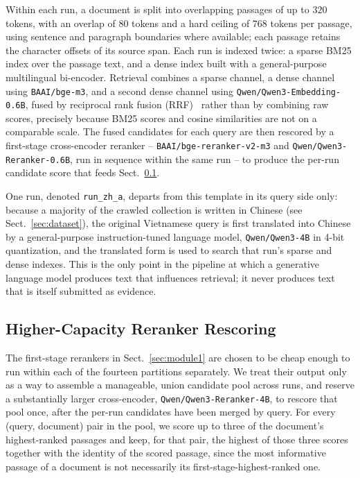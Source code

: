 \documentclass[runningheads]{llncs}
\begin{document}
Within each run, a document is split into overlapping passages of up to
$320$ tokens, with an overlap of $80$ tokens and a hard ceiling of $768$
tokens per passage, using sentence and paragraph boundaries where available;
each passage retains the character offsets of its source span. Each run is
indexed twice: a sparse BM25 index over the passage text, and a dense index
built with a general-purpose multilingual bi-encoder. Retrieval combines a
sparse channel, a dense channel using \texttt{BAAI/bge-m3}, and a second
dense channel using \texttt{Qwen/Qwen3-Embedding-0.6B}, fused by reciprocal
rank fusion (RRF)~\cite{cormack2009rrf} rather than by combining raw scores,
precisely because BM25 scores and cosine similarities are not on a comparable
scale. The fused candidates for each query are then rescored by a first-stage
cross-encoder reranker -- \texttt{BAAI/bge-reranker-v2-m3} and
\texttt{Qwen/Qwen3-Reranker-0.6B}, run in sequence within the same run -- to
produce the per-run candidate score that feeds Sect.~\ref{sec:module2}.

One run, denoted \texttt{run\_zh\_a}, departs from this template in its query
side only: because a majority of the crawled collection is written in
Chinese (see Sect.~\ref{sec:dataset}), the original Vietnamese query is first
translated into Chinese by a general-purpose instruction-tuned language model,
\texttt{Qwen/Qwen3-4B} in 4-bit quantization, and the translated form is used
to search that run's sparse and dense indexes. This is the only point in the
pipeline at which a generative language model produces text that influences
retrieval; it never produces text that is itself submitted as evidence.

\subsection{Higher-Capacity Reranker Rescoring}
\label{sec:module2}

The first-stage rerankers in Sect.~\ref{sec:module1} are chosen to be cheap
enough to run within each of the fourteen partitions separately. We treat
their output only as a way to assemble a manageable, union candidate pool
across runs, and reserve a substantially larger cross-encoder,
\texttt{Qwen/Qwen3-Reranker-4B}, to rescore that pool once, after the
per-run candidates have been merged by query. For every (query, document)
pair in the pool, we score up to three of the document's highest-ranked
passages and keep, for that pair, the highest of those three scores together
with the identity of the scored passage, since the most informative passage
of a document is not necessarily its first-stage-highest-ranked one.
\end{document}
